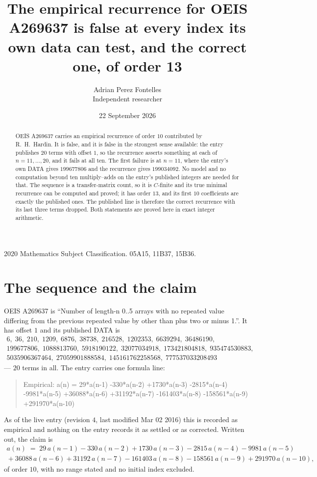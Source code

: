 \documentclass[11pt,a4paper]{article}
\title{The empirical recurrence for OEIS A269637 is false at every index its own data
can test, and the correct one, of order 13}
\author{Adrian Perez Fontelles\\ \small Independent researcher}
\date{22 September 2026}
\theoremstyle{plain}
\theoremstyle{definition}
\begin{document}
\maketitle

\begin{abstract}
OEIS A269637 carries an empirical recurrence of order $10$ contributed by R.~H.~Hardin.
It is false, and it is false in the strongest sense available: the entry publishes $20$
terms with offset $1$, so the recurrence asserts something at each of
$n=11,\dots,20$, and it fails at all ten. The first failure is at $n=11$, where the
entry's own DATA gives $199677806$ and the recurrence gives $199034092$. No model and no
computation beyond ten multiply--adds on the entry's published integers are needed for
that. The sequence is a transfer-matrix count, so it is $C$-finite and its true minimal
recurrence can be computed and proved; it has order $13$, and its first $10$ coefficients
are exactly the published ones. The published line is therefore the correct recurrence
with its last three terms dropped. Both statements are proved here in exact integer
arithmetic.
\end{abstract}

\noindent\small 2020 Mathematics Subject Classification. 05A15, 11B37, 15B36.\normalsize

\section{The sequence and the claim}

OEIS A269637 is ``Number of length-n 0..5 arrays with no repeated value differing from the
previous repeated value by other than plus two or minus 1.''. It has offset $1$ and its
published DATA is
\begin{gather*}
6,\; 36,\; 210,\; 1209,\; 6876,\; 38738,\; 216528,\; 1202353,\; 6639294,\; 36486190,\\
199677806,\; 1088813760,\; 5918190122,\; 32077034918,\; 173421804818,\; 935474530883,\\
5035906367464,\; 27059901888584,\; 145161762258568,\; 777537033208493
\end{gather*}
--- $20$ terms in all. The entry carries one formula line:
\begin{quote}\small
Empirical: a(n) = 29*a(n-1) -330*a(n-2) +1730*a(n-3) -2815*a(n-4)\\
-9981*a(n-5) +36088*a(n-6) +31192*a(n-7) -161403*a(n-8) -158561*a(n-9)\\
+291970*a(n-10)
\end{quote}
As of the live entry (revision $4$, last modified Mar 02 2016) this is recorded as
empirical and nothing on the entry records it as settled or as corrected. Written out,
the claim is
\begin{multline}\label{eq:conj}
a(n)\;=\;29\,a(n-1) - 330\,a(n-2) + 1730\,a(n-3) - 2815\,a(n-4) - 9981\,a(n-5)\\
{}+ 36088\,a(n-6) + 31192\,a(n-7) - 161403\,a(n-8) - 158561\,a(n-9) + 291970\,a(n-10),
\end{multline}
of order $10$, with no range stated and no initial index excluded.
\end{document}
